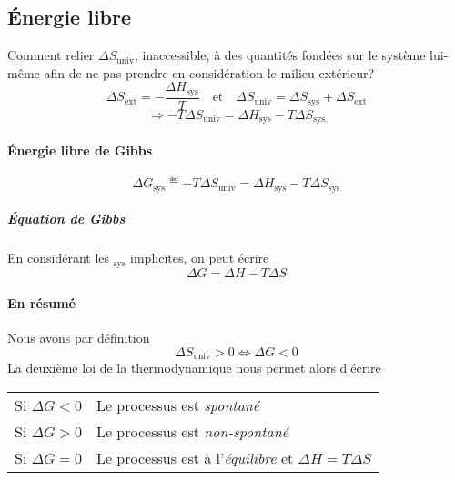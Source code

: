 
\subsection{\'Energie libre}
Comment relier $\Delta S_\mathrm{univ}$, inaccessible, à des quantités fondées sur le système lui-même afin de ne pas prendre en considération le milieu extérieur?
\[ \Delta S_\mathrm{ext}=-\frac{\Delta H_\mathrm{sys}}{T}
\quad\mathrm{et}\quad
\Delta S_\mathrm{univ}=\Delta S_\mathrm{sys}+\Delta S_\mathrm{ext} \]
$$\Rightarrow -T\Delta S_\mathrm{univ}=\Delta H_\mathrm{sys}-T\Delta S_\mathrm{sys}$$

\paragraph{\'Energie libre de Gibbs}
\[ \Delta G_\mathrm{sys} \eqdef -T\Delta S_\mathrm{univ} = \Delta H_\mathrm{sys} - T\Delta S_\mathrm{sys} \]

\subparagraph{\'Equation de Gibbs} En considérant les $_\mathrm{sys}$ implicites, on peut écrire
$$\Delta G=\Delta H-T\Delta S$$

\paragraph{En résumé}
Nous avons par définition
\[ \Delta S_\mathrm{univ} > 0 \Leftrightarrow \Delta G < 0 \]
La deuxième loi de la thermodynamique nous permet alors d'écrire
\begin{center}
	\begin{tabular}{ll}
		Si $\Delta G < 0$ & Le processus est \emph{spontané}\\
		Si $\Delta G > 0$ & Le processus est \emph{non-spontané}\\
		Si $\Delta G = 0$ & Le processus est à l'\emph{équilibre} et $\Delta H=T\Delta S$
	\end{tabular}
\end{center}

